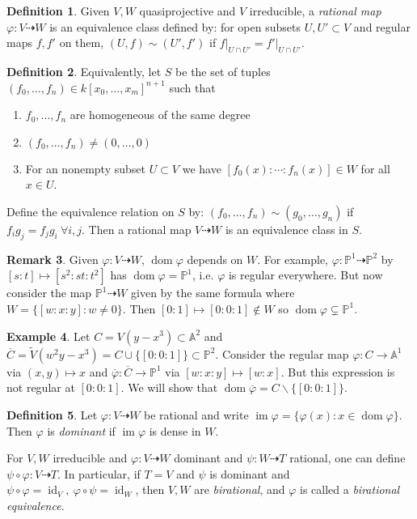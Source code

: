 \documentclass{article}
\newcommand{\A}{\mathbb{A}}
\newcommand{\p}{\mathbb{P}}
\newcommand{\id}{\operatorname{id}}
\newcommand{\im}{\operatorname{im}}
\newcommand{\dom}{\operatorname{dom}}
\theoremstyle{definition}
\newtheorem{defn}{Definition}[subsection]
\newtheorem{example}[defn]{Example}
\newtheorem{remark}[defn]{Remark}
\begin{document}
\begin{defn}
Given $V,W$ quasiprojective and $V$ irreducible, a \textit{rational map} $\varphi:V\dashrightarrow W$ is an equivalence class defined by: for open subsets $U,U'\subset V$ and regular maps $f,f'$ on them, $(U,f)\sim (U',f')$ if $\left. f\right|_{U\cap U'}=\left. f'\right|_{U\cap U'}$.
\end{defn}

\begin{defn}
Equivalently, let $S$ be the set of tuples $(f_0,\ldots,f_n)\in k[x_0,\ldots,x_m]^{n+1}$ such that
\begin{enumerate}
\item $f_0,\ldots,f_n$ are homogeneous of the same degree
\item $(f_0,\ldots,f_n)\neq (0,\ldots,0)$
\item For an nonempty subset $U\subset V$ we have $[f_0(x):\cdots:f_n(x)]\in W$ for all $x\in U$.
\end{enumerate}

Define the equivalence relation on $S$ by: $(f_0,\ldots,f_n)\sim (g_0,\ldots,g_n)$ if $f_ig_j=f_jg_i \ \forall i,j$. Then a rational map $V\dashrightarrow W$ is an equivalence class in $S$.
\end{defn}

\begin{remark}
Given $\varphi:V\dashrightarrow W$, $\dom\varphi$ depends on $W$. For example, $\varphi:\p^1\dashrightarrow\p^2$ by $[s:t]\mapsto [s^2:st:t^2]$ has $\dom\varphi=\p^1$, i.e. $\varphi$ is regular everywhere. But now consider the map $\p^1\dashrightarrow W$ given by the same formula where $W=\{[w:x:y]:w\neq 0\}$. Then $[0:1]\mapsto [0:0:1]\notin W$ so $\dom\varphi\subsetneq\p^1$.
\end{remark}

\begin{example}
Let $C=V(y-x^3)\subset\A^2$ and $\overline C=\widetilde V(w^2y-x^3)=C\cup\{[0:0:1]\}\subset\p^2$. Consider the regular map $\varphi:C\rightarrow\A^1$ via $(x,y)\mapsto x$ and $\overline\varphi:\overline C\rightarrow\p^1$ via $[w:x:y]\mapsto [w:x]$. But this expression is not regular at $[0:0:1]$. We will show that $\dom\overline\varphi=C\backslash\{[0:0:1]\}$.
\end{example}

\begin{defn}
Let $\varphi:V\dashrightarrow W$ be rational and write $\im\varphi=\{\varphi(x):x\in\dom\varphi\}$. Then $\varphi$ is \textit{dominant} if $\im\varphi$ is dense in $W$.

For $V,W$ irreducible and $\varphi:V\dashrightarrow W$ dominant and $\psi:W\dashrightarrow T$ rational, one can define $\psi\circ\varphi:V\dashrightarrow T$. In particular, if $T=V$ and $\psi$ is dominant and $\psi\circ\varphi=\id_V,\ \varphi\circ\psi=\id_W$, then $V,W$ are \textit{birational}, and $\varphi$ is called a \textit{birational equivalence}.
\end{defn}
\end{document}
